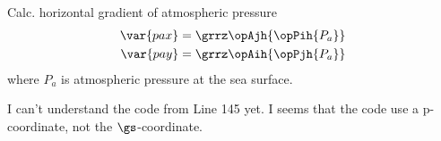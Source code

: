 
\been

\item Calc. horizontal gradient of atmospheric pressure
\bese
\begin{align}
\var{pax} &= \grrz \opAjh{\opPih{P_a}}\\
\var{pay} &= \grrz \opAih{\opPjh{P_a}}
\end{align}
\ense
\enen
where $P_a$ is atmospheric pressure at the sea surface.

{\color{red}I can't understand the code from Line 145 yet. I seems that the code
use a p-coordinate, not the $\gs$-coordinate.}


